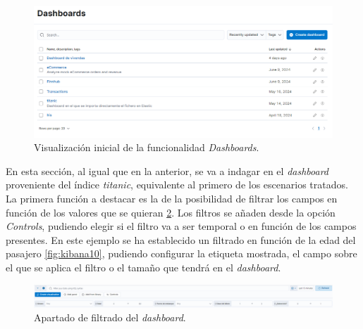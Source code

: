 \begin{figure}
    \centering
    \includegraphics[width=1\linewidth]{img/kibana8.png}
    \caption{Visualización inicial de la funcionalidad \textit{Dashboards}.}
    \label{fig:kibana8}
\end{figure}

En esta sección, al igual que en la anterior, se va a indagar en el \textit{dashboard} proveniente del índice \textit{titanic}, equivalente al primero de los escenarios tratados.
La primera función a destacar es la de la posibilidad de filtrar los campos en función de los valores que se quieran \ref{fig:kibana9}. Los filtros se añaden desde la opción \textit{Controls}, pudiendo elegir si el filtro va a ser temporal o en función de los campos presentes. En este ejemplo se ha establecido un filtrado en función de la edad del pasajero \ref{fig:kibana10}, pudiendo configurar la etiqueta mostrada, el campo sobre el que se aplica el filtro o el tamaño que tendrá en el \textit{dashboard}.

\begin{figure}
    \centering
    \includegraphics[width=1\linewidth]{img/kibana9.png}
    \caption{Apartado de filtrado del \textit{dashboard}.}
    \label{fig:kibana9}
\end{figure}

